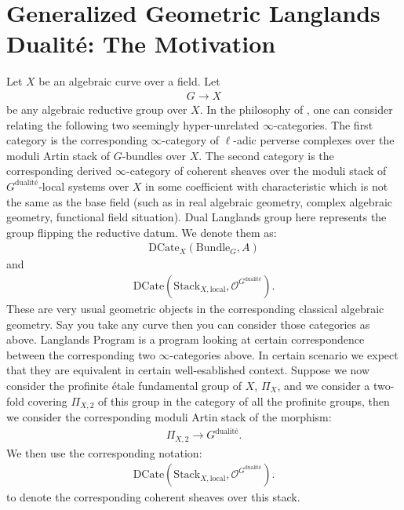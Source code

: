 \documentclass[12pt]{book}
\theoremstyle{definition}
\begin{document}
\section{Generalized Geometric Langlands Dualit\'e: The Motivation}


\noindent Let $X$ be an algebraic curve over a field. Let 
\begin{align}
G\longrightarrow X
\end{align}
be any algebraic reductive group over $X$. In the philosophy of \cite{La}, one can consider relating the following two seemingly hyper-unrelated $\infty$-categories. The first category is the corresponding $\infty$-category of $\ell$-adic perverse complexes over the moduli Artin stack of $G$-bundles over $X$. The second category is the corresponding derived $\infty$-category of coherent sheaves over the moduli stack of $G^\text{dualit\'e}$-local systems over $X$ in some coefficient with characteristic which is not the same as the base field (such as in real algebraic geometry, complex algebraic geometry, functional field situation). Dual Langlands group here represents the group flipping the reductive datum. We denote them as:
\begin{align}
\mathrm{DCate}_X(\mathrm{Bundle}_G,A)
\end{align}
and
\begin{align}
\mathrm{DCate}(\mathrm{Stack}_{X,\mathrm{local}},\mathcal{O}^{G^\text{dualit\'e}}).
\end{align}
These are very usual geometric objects in the corresponding classical algebraic geometry. Say you take any curve then you can consider those categories as above. Langlands Program is a program looking at certain correspondence between the corresponding two $\infty$-categories above. In certain scenario we expect that they are equivalent in certain well-esablished context. Suppose we now consider the profinite \'etale fundamental group of $X$, $\Pi_X$, and we consider a two-fold covering $\Pi_{X,2}$ of this group in the category of all the profinite groups, then we consider the corresponding moduli Artin stack of the morphism:
\begin{align}
\Pi_{X,2} \rightarrow G^\text{dualit\'e}.
\end{align}
We then use the corresponding notation:
\begin{align}
\mathrm{DCate}(\mathrm{Stack}_{X,\mathrm{local}},\mathcal{O}^{G^\text{dualit\'e}}).
\end{align}
to denote the corresponding coherent sheaves over this stack.
\end{document}
